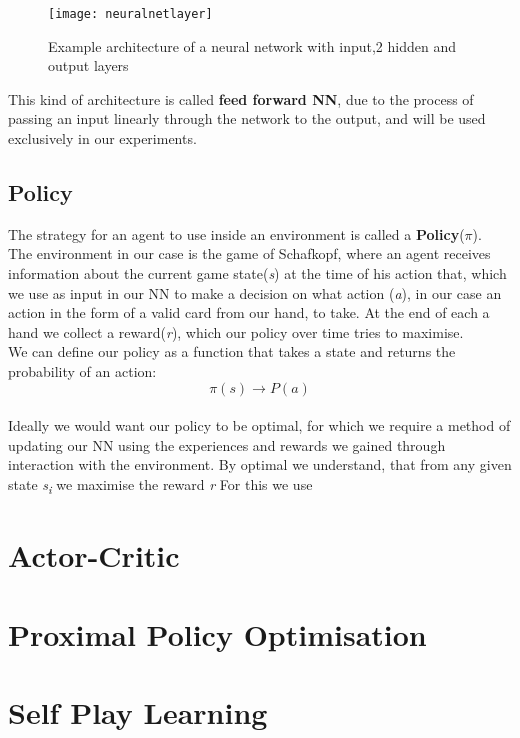 \begin{figure}[h!]
    \centering
    \texttt{[image: neuralnetlayer]}
    \caption{Example architecture of a neural network with input,2 hidden and output layers}
    \label{fig:architecture}
\end{figure}
This kind of architecture is called \textbf{feed forward NN}, due to the process of passing an input linearly through
the network to the output, and will be used exclusively in our experiments.\\

\subsection{Policy}
The strategy for an agent to use inside an environment is called a \textbf{Policy}($\pi$).\\
The environment in our case is the game of Schafkopf, where an agent receives information about the current game
state(\textit{s}) at the time of his action that, which we use as input in our NN to make a decision on what action
(\textit{a}), in our case an action in the form of a valid card from our hand, to take.
At the end of each a hand we collect a reward(\textit{r}), which our policy over time tries to maximise.\\
We can define our policy as a function that takes a state and returns the probability of an action:\\
\[ \pi(s)\rightarrow P(a)\]\\
Ideally we would want our policy to be optimal, for which we require a method of updating our NN using the
experiences and rewards we gained through interaction with the environment.
By optimal we understand, that from any given state \textit{s\textsubscript{i}} we maximise the reward \textit{r}
For this we use


\section{Actor-Critic}


\section{Proximal Policy Optimisation}


\section{Self Play Learning}
